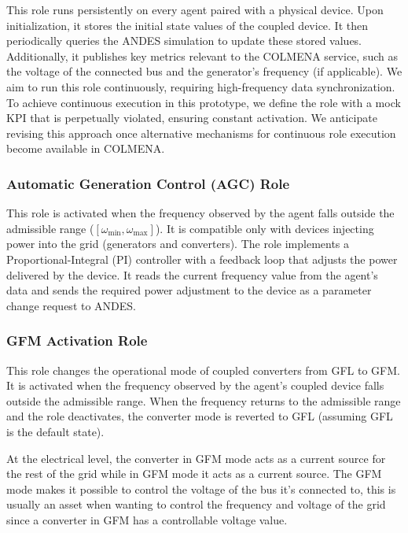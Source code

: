 \documentclass{article}
\begin{document}
This role runs persistently on every agent paired with a physical device. Upon initialization, it stores the initial state values of the coupled device. It then periodically queries the ANDES simulation to update these stored values. Additionally, it publishes key metrics relevant to the COLMENA service, such as the voltage of the connected bus and the generator's frequency (if applicable). We aim to run this role continuously, requiring high-frequency data synchronization. To achieve continuous execution in this prototype, we define the role with a mock KPI that is perpetually violated, ensuring constant activation. We anticipate revising this approach once alternative mechanisms for continuous role execution become available in COLMENA.

\subsubsection*{Automatic Generation Control (AGC) Role}

This role is activated when the frequency observed by the agent falls outside the admissible range ($[\omega_{\min}, \omega_{\max}]$). It is compatible only with devices injecting power into the grid (generators and converters). The role implements a Proportional-Integral (PI) controller with a feedback loop that adjusts the power delivered by the device. It reads the current frequency value from the agent's data and sends the required power adjustment to the device as a parameter change request to ANDES. 



\subsubsection*{GFM Activation Role}

This role changes the operational mode of coupled converters from GFL to GFM. It is activated when the frequency observed by the agent's coupled device falls outside the admissible range. When the frequency returns to the admissible range and the role deactivates, the converter mode is reverted to GFL (assuming GFL is the default state).

At the electrical level, the converter in GFM mode acts as a current source for the rest of the grid while in GFM mode it acts as a current source. The GFM mode makes it possible to control the voltage of the bus it's connected to, this is usually an asset when wanting to control the frequency and voltage of the grid since a converter in GFM has a controllable voltage value. 
\end{document}
